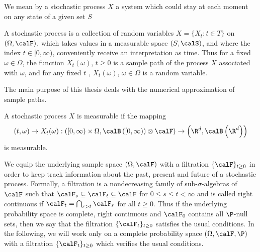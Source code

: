 
	We mean by a stochastic process $X$ a system which could stay at each moment on any state of a given set $S$
\begin{dfn}
	A stochastic process is a collection of random variables $X=\{X_t: t \in T\}$ on $(\Omega,
	\calF)$,  which takes values in a measurable space $(S,\calS)$, and where the index $t\in [0,\infty)$, 
	conveniently receive an interpretation as time. Thus for a fixed $\omega \in \Omega$, the function
	$X_t(\omega)$, $t\geq 0$ is a sample path of the process $X$ associated with $\omega$,  and for any
	fixed $t$ , $X_t(\omega)$, $\omega \in \Omega$ is a random variable. 

\end{dfn}
 The main purpose of this thesis deals with the numerical approximation of sample paths.
\begin{definition}
	A stochastic process $X$ is measurable if the mapping
	\begin{equation*}
		(t, \omega) \to X_t(\omega):
		\left(
			[0,\infty)\times \Omega,
			\calB \left(
				[0,\infty)
			\right) \otimes \calF
		\right)
		\to 
		\left(
			\R^d, \calB \left (\R^d \right)
		\right)
	\end{equation*}
	is measurable.
\end{definition}
%
	We equip the underlying sample space $(\Omega, \calF)$ with a filtration $\{\calF\}_{t\geq 0}$ in order to 
keep track information about the past, present and future of a stochastic process. Formally, a filtration is
a nondecreasing family of sub-$\sigma$-algebras of $\calF$ such that 
$\calF_s\subseteq \calF_t \subseteq \calF$ for $0\leq s \leq t <\infty$ and is called right continuous if
$ %
	\calF_t = \bigcap_{r>t} \calF_r
$
for all $t\geq 0$. Thus if the underlying probability space is complete,
right continuous and $\calF_0$ contains all $\P$-null sets, then we say that the filtration
$\{ \calF_t\}_{t\geq 0}$ satisfies the usual conditions. In the following, we will work only on a
complete probability space $(\Omega, \calF, \P)$  with a filtration $\{\calF_t \}_{t \geq 0}$ which verifies
the usual conditions.
	
